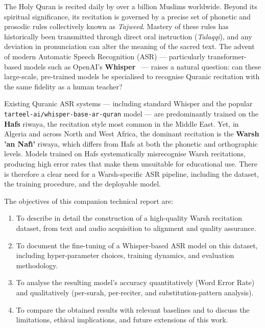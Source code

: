 \documentclass[12pt,a4paper]{report}
\begin{document}
The Holy Quran is recited daily by over a billion Muslims worldwide. Beyond
its spiritual significance, its recitation is governed by a precise set of
phonetic and prosodic rules collectively known as \textit{Tajweed}. Mastery
of these rules has historically been transmitted through direct oral
instruction (\textit{Talaqqi}), and any deviation in pronunciation can
alter the meaning of the sacred text. The advent of modern Automatic Speech
Recognition (ASR) --- particularly transformer-based models such as OpenAI's
\textbf{Whisper}~\cite{radford2022whisper} --- raises a natural question: can
these large-scale, pre-trained models be specialised to recognise Quranic
recitation with the same fidelity as a human teacher?

\begin{warnbox}[title=Problem Statement]
Existing Quranic ASR systems --- including standard Whisper and the popular
\texttt{tarteel-ai/whisper-base-ar-quran} model --- are predominantly trained
on the \textbf{Hafs} riwaya, the recitation style most common in the Middle
East. Yet, in Algeria and across North and West Africa, the dominant
recitation is the \textbf{Warsh 'an Naf{\^\i}'} riwaya, which differs from
Hafs at both the phonetic and orthographic levels. Models trained on Hafs
systematically misrecognise Warsh recitations, producing high error rates
that make them unsuitable for educational use. There is therefore a clear
need for a Warsh-specific ASR pipeline, including the dataset, the training
procedure, and the deployable model.
\end{warnbox}

The objectives of this companion technical report are:
\begin{enumerate}
  \item To describe in detail the construction of a high-quality Warsh
        recitation dataset, from text and audio acquisition to alignment
        and quality assurance.
  \item To document the fine-tuning of a Whisper-based ASR model on this
        dataset, including hyper-parameter choices, training dynamics, and
        evaluation methodology.
  \item To analyse the resulting model's accuracy quantitatively (Word
        Error Rate) and qualitatively (per-surah, per-reciter, and
        substitution-pattern analysis).
  \item To compare the obtained results with relevant baselines and to
        discuss the limitations, ethical implications, and future
        extensions of this work.
\end{enumerate}
\end{document}
